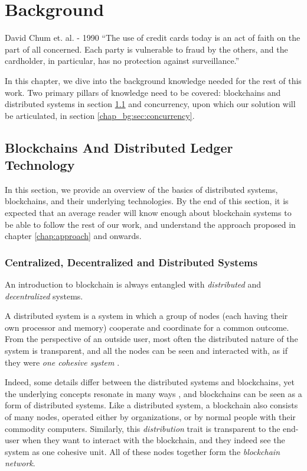 \chapter{Background} \label{chap:background}

\begin{chapquote}{David Chum et. al. - 1990}
``The use of credit cards today is an act of faith on the part of all concerned. Each party is
vulnerable to fraud by the others, and the cardholder, in particular, has no protection against
surveillance.''
\end{chapquote}


In this chapter, we dive into the background knowledge needed for the rest of this work. Two primary
pillars of knowledge need to be covered: blockchains and distributed systems in section
\ref{chap_bg:sec:blockchains} and concurrency, upon which our solution will be articulated, in
section \ref{chap_bg:sec:concurrency}.

\section{Blockchains And Distributed Ledger Technology} \label{chap_bg:sec:blockchains}

In this section, we provide an overview of the basics of distributed systems, blockchains, and their
underlying technologies. By the end of this section, it is expected that an average reader will know
enough about blockchain systems to be able to follow the rest of our work, and understand the
approach proposed in chapter \ref{chap:approach} and onwards.

\subsection{Centralized, Decentralized and Distributed Systems} \label{chap_bg_:subsec:network}

An introduction to blockchain is always entangled with \textit{distributed} and
\textit{decentralized} systems.

A distributed system is a system in which a group of nodes (each having their own processor and
memory) cooperate and coordinate for a common outcome. From the perspective of an outside user, most
often the distributed nature of the system is transparent, and all the nodes can be seen and
interacted with, as if they were \textit{one cohesive system}
\cite{bashirMASTERINGBLOCKCHAINDistributed2018}.

Indeed, some details differ between the distributed systems and blockchains, yet the underlying
concepts resonate in many ways \cite{herlihyBlockchainsDistributedComputing2019}, and blockchains
can be seen as a form of distributed systems. Like a distributed system, a blockchain also consists
of many nodes, operated either by organizations, or by normal people with their commodity computers.
Similarly, this \textit{distribution} trait is transparent to the end-user when they want to
interact with the blockchain, and they indeed see the system as one cohesive unit. All of these
nodes together form the \textit{blockchain network}.

